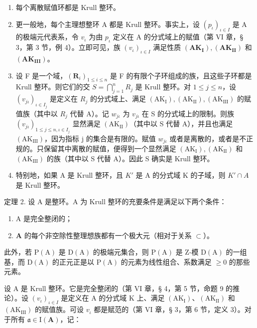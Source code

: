 \begin{enumerate}
\def\labelenumi{(\arabic{enumi})}
\item
  每个离散赋值环都是 Krull 整环。
\item
  更一般地，每个主理想整环 A 都是 Krull 整环。事实上，设 \((p_{\iota})_{\iota\in I}\) 是 A 的极端元代表系，令 \(v_{\iota}\) 为由 \(p_{\iota}\) 定义在 A 的分式域上的赋值（第 VI 章，§ 3，第 3 节，例 4）。立即可见，族 \((v_{\iota})_{\iota\in I}\) 满足性质 \((\mathbf{AK}_{\mathbf{I}}), (\mathbf{AK}_{\mathbf{II}})\) 和 \((\mathbf{AK}_{\mathbf{III}})\)。
\item
  设 F 是一个域，\((\mathbf{R}_{i})_{1\leqslant i\leqslant n}\) 是 F 的有限个子环组成的族，且这些子环都是 Krull 整环。则它们的交 \(S=\bigcap_{j=1}^{n}R_{j}\) 是 Krull 整环。对 \(1\leqslant j\leqslant n\)，设 \((v_{j\iota})_{\iota\in I_j}\) 是定义在 \(R_{j}\) 的分式域上、满足 \((\mathrm{AK}_{\mathrm{I}}),(\mathrm{AK}_{\mathrm{II}}),(\mathrm{AK}_{\mathrm{III}})\) 的赋值族（其中以 \(R_{j}\) 代替 A）。记 \(w_{j\iota}\) 为 \(v_{j\iota}\) 在 S 的分式域上的限制。则族 \((v_{j\iota})_{1\leqslant j\leqslant n,\iota\in I_j}\) 显然满足 \((\mathrm{AK}_{\mathrm{II}})\)（其中以 S 代替 A），并且也满足 \((\mathrm{AK}_{\mathrm{III}})\)，因为指标 j 的集合是有限的。赋值 \(w_{j\iota}\) 或者是离散的，或者是不正规的。只保留其中离散的赋值，便得到一个显然满足 \((\mathrm{AK}_{\mathrm{I}}),(\mathrm{AK}_{\mathrm{II}})\) 和 \((\mathrm{AK}_{\mathrm{III}})\) 的族（其中以 S 代替 A）。因此 S 确实是 Krull 整环。
\item
  特别地，如果 A 是 Krull 整环，且 \(K'\) 是 A 的分式域 K 的子域，则 \(K' \cap A\) 是 Krull 整环。
\end{enumerate}

定理 2. 设 A 是整环。A 为 Krull 整环的充要条件是满足以下两个条件：

\begin{enumerate}
\def\labelenumi{(\alph{enumi})}
\item
  A 是完全整闭的；
\item
  \(\mathbf{A}\) 的每个非空除性整理想族都有一个极大元（相对于关系 \(\subset\)）。
\end{enumerate}

此外，若 \(\mathrm{P}(\mathrm{A})\) 是 \(\mathrm{D}(\mathrm{A})\) 的极端元集合，则 \(\mathrm{P}(\mathrm{A})\) 是 Z-模 \(\mathrm{D}(\mathrm{A})\) 的一组基，而 \(\mathrm{D}(\mathrm{A})\) 的正元正是以 \(\mathrm{P}(\mathrm{A})\) 的元素为线性组合、系数满足 \(\geqslant0\) 的那些元素。

设 A 是 Krull 整环。它是完全整闭的（第 VI 章，§ 4，第 5 节，命题 9 的推论）。设 \((v_{\iota})_{\iota\in I}\) 是定义在 A 的分式域 K 上、满足 \((\mathrm{AK}_{\mathrm{I}})\)、\((\mathrm{AK}_{\mathrm{II}})\) 和 \((\mathrm{AK}_{\mathrm{III}})\) 的赋值族。可设 \(v_{\iota}\) 都是赋范的（第 VI 章，§ 3，第 6 节，定义 3）。对于所有 \(\mathfrak{a} \in \mathrm{I}(\mathbf{A})\)，记：

